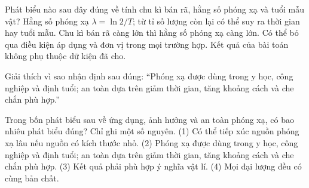 \begin{ex}
Phát biểu nào sau đây đúng về tính chu kì bán rã, hằng số phóng xạ và tuổi mẫu vật?
\choice
{\True Hằng số phóng xạ $\lambda=\ln2/T$; từ tỉ số lượng còn lại có thể suy ra thời gian hay tuổi mẫu.}
{Chu kì bán rã càng lớn thì hằng số phóng xạ càng lớn.}
{Có thể bỏ qua điều kiện áp dụng và đơn vị trong mọi trường hợp.}
{Kết quả của bài toán không phụ thuộc dữ kiện đã cho.}
\end{ex}

\begin{bt}
Giải thích vì sao nhận định sau đúng: “Phóng xạ được dùng trong y học, công nghiệp và định tuổi; an toàn dựa trên giảm thời gian, tăng khoảng cách và che chắn phù hợp.”
\end{bt}

\begin{ex}
Trong bốn phát biểu sau về ứng dụng, ảnh hưởng và an toàn phóng xạ, có bao nhiêu phát biểu đúng? Chỉ ghi một số nguyên. (1) Có thể tiếp xúc nguồn phóng xạ lâu nếu nguồn có kích thước nhỏ. (2) Phóng xạ được dùng trong y học, công nghiệp và định tuổi; an toàn dựa trên giảm thời gian, tăng khoảng cách và che chắn phù hợp. (3) Kết quả phải phù hợp ý nghĩa vật lí. (4) Mọi đại lượng đều có cùng bản chất.
\end{ex}

